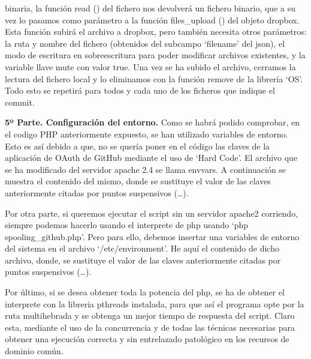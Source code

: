 \documentclass{article}
\begin{document}
\begin{enumerate}
    binaria, la función read () del fichero nos devolverá un fichero binario, que a su vez
    lo pasamos como parámetro a la función files\_upload () del objeto dropbox. Esta función
    subirá el archivo a dropbox, pero también necesita otros parámetros: la ruta y nombre
    del fichero (obtenidos del subcampo `filename' del json), el modo de escritura en
    sobreescritura para poder modificar archivos existentes, y la variable llave mute
    con valor true. Una vez se ha subido el archivo, cerramos la lectura del fichero local
    y lo eliminamos con la función remove de la librería `OS'. Todo esto se repetirá para
    todos y cada uno de los ficheros que indique el commit.
\end{enumerate}

\textbf{5º Parte. Configuración del entorno.}
Como se habrá podido comprobar, en el codigo PHP anteriormente expuesto, se
han utilizado variables de entorno. Esto es así debido a que, no se quería
poner en el código las claves de la aplicación de OAuth de GitHub mediante el
uso de `Hard Code'. El archivo que se ha modificado del servidor apache 2.4
se llama envvars. A continuación se muestra el contenido del mismo, donde
se sustituye el valor de las claves anteriormente citadas por puntos suspensivos
(\ldots).



Por otra parte, si queremos ejecutar el script sin un servidor apache2 corriendo, siempre podemos hacerlo
usando el interprete de php usando `php spooling\_github.php'. Pero para ello, debemos insertar
una variables de entorno del sistema en el archivo `/etc/environment'. He aquí el contenido de dicho
archivo, donde, se sustituye el valor de las claves anteriormente citadas por puntos suspensivos
(\ldots).



Por último, si se desea obtener toda la potencia del php, se ha de obtener el interprete
con la libreria pthreads instalada, para que así el programa opte por la ruta multihebrada
y se obtenga un mejor tiempo de respuesta del script. Claro esta, mediante el uso de la
concurrencia y de todas las técnicas necesarias para obtener una ejecución correcta y
sin entrelazado patológico en los recursos de dominio común.
\end{document}
